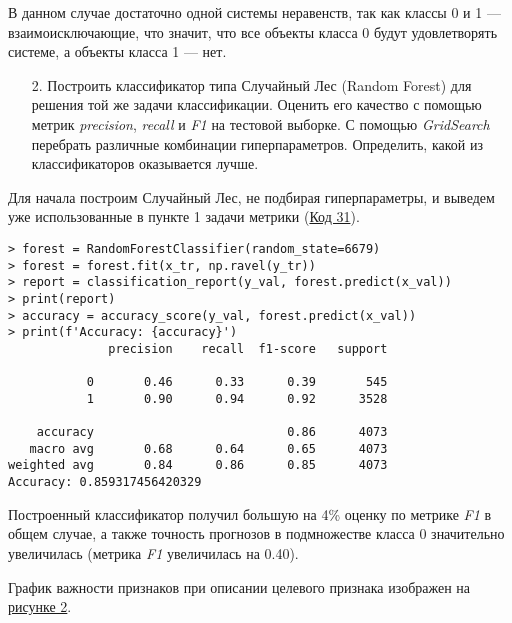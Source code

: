 В данном случае достаточно одной системы неравенств, так как классы 0 и 1 --- взаимоисключающие, что значит, что все объекты класса 0 будут удовлетворять системе, а объекты класса 1 --- нет.

\begin{enumerate}
    \item[2.] Построить классификатор типа Случайный Лес (Random Forest) для решения той же задачи классификации. Оценить его качество с помощью метрик \textit{precision}, \textit{recall} и \textit{F1} на тестовой выборке. С помощью \textit{GridSearch} перебрать различные комбинации гиперпараметров. Определить, какой из классификаторов оказывается лучше.
\end{enumerate}

Для начала построим Случайный Лес, не подбирая гиперпараметры, и выведем уже использованные в пункте 1 задачи метрики (\hyperref[code:31]{Код 31}).

\begin{code}
\begin{verbatim}
> forest = RandomForestClassifier(random_state=6679)
> forest = forest.fit(x_tr, np.ravel(y_tr))
> report = classification_report(y_val, forest.predict(x_val))
> print(report)
> accuracy = accuracy_score(y_val, forest.predict(x_val))
> print(f'Accuracy: {accuracy}')
              precision    recall  f1-score   support

           0       0.46      0.33      0.39       545
           1       0.90      0.94      0.92      3528

    accuracy                           0.86      4073
   macro avg       0.68      0.64      0.65      4073
weighted avg       0.84      0.86      0.85      4073
Accuracy: 0.859317456420329
\end{verbatim}
\label{code:31}
\end{code}

Построенный классификатор получил большую на 4\% оценку по метрике \textit{F1} в общем случае, а также точность прогнозов в подмножестве класса 0 значительно увеличилась (метрика \textit{F1} увеличилась на 0.40).

График важности признаков при описании целевого признака изображен на \hyperref[image:2]{рисунке 2}.

\label{image:2}

